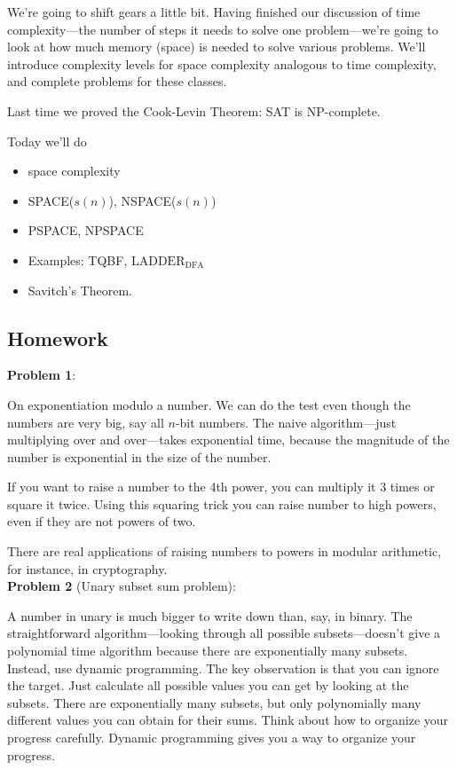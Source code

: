 
We're going to shift gears a little bit. Having finished our discussion of time complexity---the number of steps it needs to solve one problem---we're going to look at how much memory (space) is needed to solve various problems. We'll introduce complexity levels for space complexity analogous to time complexity, and complete problems for these classes. 

Last time we proved the Cook-Levin Theorem: SAT is NP-complete.

Today we'll do
\begin{itemize}
\item
space complexity
\item
SPACE($s(n)$), NSPACE($s(n)$)
\item
PSPACE, NPSPACE
\item
Examples: TQBF, $\text{LADDER}_{\text{DFA}}$
\item
Savitch's Theorem.
\end{itemize}
\subsection*{Homework}

\textbf{Problem 1}: %

On exponentiation modulo a number. We can do the test even though the numbers are very big, say all $n$-bit numbers. The naive algorithm---just multiplying over and over---takes exponential time, because the magnitude of the number is exponential in the size of the number.

If you want to raise a number to the 4th power, you can multiply it 3 times or square it twice. Using this squaring trick you can raise number to high powers, even if they are not powers of two.

There are real applications of raising numbers to powers in modular arithmetic, for instance, in cryptography.\\

\textbf{Problem 2} (Unary subset sum problem):

A number in unary is much bigger to write down than, say, in binary. The straightforward algorithm---looking through all possible subsets---doesn't give a polynomial time algorithm because there are exponentially many subsets. Instead, use dynamic programming. The key observation is that you can ignore the target. Just calculate all possible values you can get by looking at the subsets. There are exponentially many subsets, but only 
polynomially many different values you can obtain for their sums.  Think about how to organize your progress carefully. Dynamic programming gives you a way to organize your progress.\\

